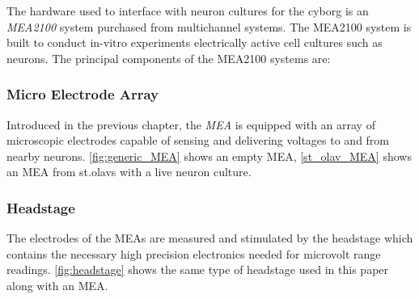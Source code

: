The hardware used to interface with neuron cultures for the cyborg is an
\textit{MEA2100} system purchased from multichannel systems. 
The MEA2100 system is built to conduct in-vitro experiments electrically active
cell cultures such as neurons.
The principal components of the MEA2100 systems are:
\subsubsection{Micro Electrode Array}
Introduced in the previous chapter, the \textit{MEA} is equipped with an array
of microscopic electrodes capable of sensing and delivering voltages to and from
nearby neurons.
\ref{fig:generic_MEA} shows an empty MEA,
\ref{st_olav_MEA} shows an MEA from st.olavs with a live neuron culture.
\subsubsection{Headstage}
The electrodes of the MEAs are measured and stimulated by the headstage which
contains the necessary high precision electronics needed for microvolt range readings.
\ref{fig:headstage} shows the same type of headstage used in this paper along
with an MEA.
